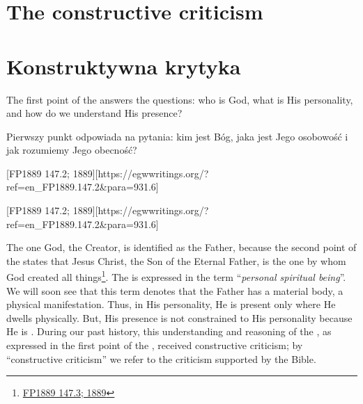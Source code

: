 \chapter{The constructive criticism}


\chapter{Konstruktywna krytyka}


The first point of the  answers the questions: who is God, what is His personality, and how do we understand His presence?


Pierwszy punkt  odpowiada na pytania: kim jest Bóg, jaka jest Jego osobowość i jak rozumiemy Jego obecność?


[FP1889 147.2; 1889][https://egwwritings.org/?ref=en\_FP1889.147.2&para=931.6]


[FP1889 147.2; 1889][https://egwwritings.org/?ref=en\_FP1889.147.2&para=931.6]


The one God, the Creator, is identified as the Father, because the second point of the  states that Jesus Christ, the Son of the Eternal Father, is the one by whom God created all things\footnote{\href{https://egwwritings.org/?ref=en_FP1889.147.3&para=931.7}{FP1889 147.3; 1889}}. The  is expressed in the term “\textit{personal spiritual being}”. We will soon see that this term denotes that the Father has a material body, a physical manifestation. Thus, in His personality, He is present only where He dwells physically. But, His presence is not constrained to His personality because He is . During our past history, this understanding and reasoning of the , as expressed in the first point of the , received constructive criticism; by “constructive criticism” we refer to the criticism supported by the Bible.


